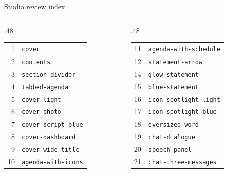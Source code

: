 \documentclass[aspectratio=169]{beamer}
\begin{document}
\begin{frame}{Studio review index}\fontsize{6.5}{9}\selectfont\begin{columns}[T]
\begin{column}{.48\textwidth}\begin{tabular}{rl}
1 & \texttt{cover} \\
2 & \texttt{contents} \\
3 & \texttt{section-divider} \\
4 & \texttt{tabbed-agenda} \\
5 & \texttt{cover-light} \\
6 & \texttt{cover-photo} \\
7 & \texttt{cover-script-blue} \\
8 & \texttt{cover-dashboard} \\
9 & \texttt{cover-wide-title} \\
10 & \texttt{agenda-with-icons} \\
\end{tabular}\end{column}
\begin{column}{.48\textwidth}\begin{tabular}{rl}
11 & \texttt{agenda-with-schedule} \\
12 & \texttt{statement-arrow} \\
14 & \texttt{glow-statement} \\
15 & \texttt{blue-statement} \\
16 & \texttt{icon-spotlight-light} \\
17 & \texttt{icon-spotlight-blue} \\
18 & \texttt{oversized-word} \\
19 & \texttt{chat-dialogue} \\
20 & \texttt{speech-panel} \\
21 & \texttt{chat-three-messages} \\
\end{tabular}\end{column}
\end{columns}\end{frame}
\end{document}
